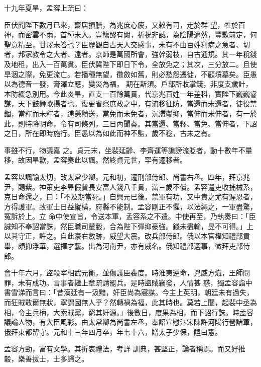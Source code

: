 \begin{pinyinscope}
 十九年夏旱，孟容上疏曰：



 臣伏聞陛下數月已來，齋居損膳，為兆庶心疲，又敕有司，走於群
 望，牲於百神，而密雲不雨，首種未入。豈觴醪有闕，祈祝非誠，為陰陽適然，豐歉前定，何聖意精至，甘澤未答也？臣歷觀自古天人交感事，未有不由百姓利病之急者、切者，邦家教令之大者、遠者。京師是萬國所會，強幹弱枝，自古通規。其一年稅錢及地租，出入一百萬貫。臣伏冀陛下即日下令，全放免之；其次，三分放二。且使旱涸之際，免更流亡。若播種無望，徵斂如舊，則必愁怨遷徙，不顧墳墓矣。臣愚以為德音一發，膏澤立應，變災為福，
 期在斯須。戶部所收掌錢，非度支歲計，本防緩急別用。今此炎旱，直支一百餘萬貫，代京兆百姓一年差科，實陛下巍巍睿謀，天下鼓舞歌揚者也。復更省察庶政之中，有流移征防，當還而未還者，徒役禁錮，當釋而未釋者，逋懸饋送，當免而未免者，沉滯鬱抑，當伸而未伸者，有一於此，則特降明命，令有司條列，三日內聞奏。其當還、當釋、當免、當伸者，下詔之日，所在即時施行。臣愚以為如此而神不監，歲不稔，古未之有。



 事雖不行，物議嘉
 之。貞元末，坐裴延齡、李齊運等讒謗流貶者，動十數年不量移，故因旱歉，孟容奏此以諷。然終貞元世，罕有遷移者。



 孟容以諷諭太切，改太常少卿。元和初，遷刑部侍郎、尚書右丞。四年，拜京兆尹，賜紫。神策吏李昱假貸長安富人錢八千貫，滿三歲不償。孟容遣吏收捕械系，克日命還之，曰：「不及期當死。」自興元已後，禁軍有功，又中貴之尤有渥恩者，方得護軍。故軍士日益縱橫，府縣不能制。孟容剛正不懼，以法繩之，一軍盡驚，冤訴於上。立
 命中使宣旨，令送本軍，孟容系之不遣。中使再至，乃執奏曰：「臣誠知不奉詔當誅，然臣職司輦轂，合為陛下彈抑豪強。錢未盡輸，昱不可得。」上以其守正，許之。自此豪右斂跡，威望大震。改兵部侍郎。俄以本官權知禮部貢舉，頗抑浮華，選擇才藝。出為河南尹，亦有威名。俄知禮部選事，徵拜吏部侍郎。



 會十年六月，盜殺宰相武元衡，並傷議臣裴度。時淮夷逆命，兇威方熾，王師問罪，未有成功。言事者繼上章疏請罷兵。是時盜賊竊發，人情甚
 惑，獨孟容詣中書雪涕而言曰：「昔漢廷有一汲黯，奸臣尚為寢謀。今主上英明，朝廷未有過失，而狂賊敢爾無狀，寧謂國無人乎？然轉禍為福，此其時也。莫若上聞，起裴中丞為相，令主兵柄，大索賊黨，窮其奸源。」後數日，度果為相，而下詔行誅。時孟容議論人物，有大臣風彩。由太常卿為尚書左丞，奉詔宣慰汴宋陳許河陽行營諸軍，俄拜東都留守。元和十三年四月卒，年七十六，贈太子少保，謚曰憲。



 孟容方勁，富有文學。其折衷禮法，考詳
 訓典，甚堅正，論者稱焉。而又好推轂，樂善拔士，士多歸之。




\end{pinyinscope}
